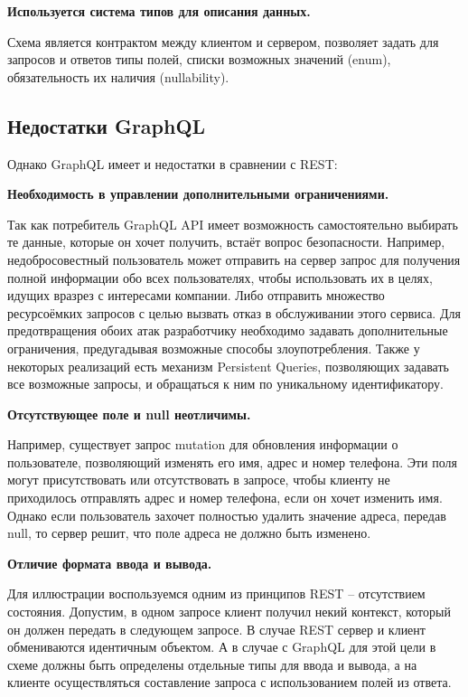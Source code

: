 \textbf{Используется система типов для описания данных.}

Схема является контрактом между клиентом и сервером, позволяет задать для запросов и ответов типы полей, списки возможных значений (enum), обязательность их наличия (nullability).

\subsection{Недостатки GraphQL}\label{subsec:graphql-disadvantages}

Однако GraphQL имеет и недостатки в сравнении с REST\cite{rest-soap-graphql-guide}\cite{graphql-whats-wrong}:

\textbf{Необходимость в управлении дополнительными ограничениями.}\label{graphql-disadvantage-constraints}

Так как потребитель GraphQL API имеет возможность самостоятельно выбирать те данные, которые он хочет получить, встаёт вопрос безопасности.
Например, недобросовестный пользователь может отправить на сервер запрос для получения полной информации обо всех пользователях, чтобы использовать их в целях, идущих вразрез с интересами компании.
Либо отправить множество ресурсоёмких запросов с целью вызвать отказ в обслуживании этого сервиса.
Для предотвращения обоих атак разработчику необходимо задавать дополнительные ограничения, предугадывая возможные способы злоупотребления.
Также у некоторых реализаций есть механизм Persistent Queries, позволяющих задавать все возможные запросы, и обращаться к ним по уникальному идентификатору.

\textbf{Отсутствующее поле и null неотличимы.}\label{graphql-disadvantage-missing-or-null}

Например, существует запрос mutation для обновления информации о пользователе, позволяющий изменять его имя, адрес и номер телефона.
Эти поля могут присутствовать или отсутствовать в запросе, чтобы клиенту не приходилось отправлять адрес и номер телефона, если он хочет изменить имя.
Однако если пользователь захочет полностью удалить значение адреса, передав null, то сервер решит, что поле адреса не должно быть изменено.

\textbf{Отличие формата ввода и вывода.}\label{graphql-disadvantage-input-output-differ}

Для иллюстрации воспользуемся одним из принципов REST – отсутствием состояния.
Допустим, в одном запросе клиент получил некий контекст, который он должен передать в следующем запросе.
В случае REST сервер и клиент обмениваются идентичным объектом.
А в случае с GraphQL для этой цели в схеме должны быть определены отдельные типы для ввода и вывода, а на клиенте осуществляться составление запроса с использованием полей из ответа.


